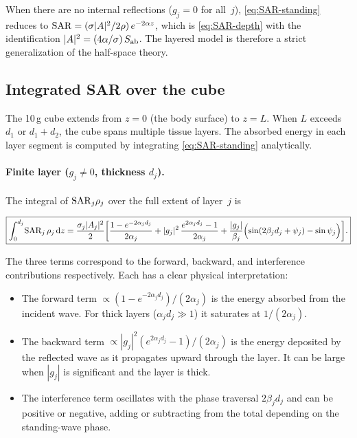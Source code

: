 \begin{remark}
When there are no internal reflections ($g_j = 0$ for all~$j$),
\cref{eq:SAR-standing} reduces to $\mathrm{SAR} = (\sigma|A|^2/2\rho)\,
e^{-2\alpha z}$, which is \cref{eq:SAR-depth} with the identification
$|A|^2 = (4\alpha/\sigma)\,S_{\mathrm{ab}}$.  The layered model is therefore a
strict generalization of the half-space theory.
\end{remark}


\subsection{Integrated SAR over the cube}
\label{sec:layered-integral}

The 10\,g cube extends from $z = 0$ (the body surface) to $z = L$.  When
$L$ exceeds $d_1$ or $d_1 + d_2$, the cube spans multiple tissue layers.
The absorbed energy in each layer segment is computed by integrating
\cref{eq:SAR-standing} analytically.

\paragraph{Finite layer ($g_j \neq 0$, thickness $d_j$).}
The integral of $\mathrm{SAR}_j \rho_j$ over the full extent of layer~$j$ is

\begin{equation}\label{eq:layer-integral}
  \boxed{%
  \int_0^{d_j}\!\SAR_j\,\rho_j\,\mathrm{d}z
  = \frac{\sigma_j |A_j|^2}{2}
    \biggl[
      \frac{1 - e^{-2\alpha_j d_j}}{2\alpha_j}
    + |g_j|^2\,\frac{e^{2\alpha_j d_j} - 1}{2\alpha_j}
    + \frac{|g_j|}{\beta_j}\Bigl(
        \sin(2\beta_j d_j + \psi_j) - \sin\psi_j
      \Bigr)
    \biggr].
  }
\end{equation}

\noindent
The three terms correspond to the forward, backward, and interference
contributions respectively.  Each has a clear physical interpretation:

\begin{itemize}[nosep]
\item The forward term $\propto (1 - e^{-2\alpha_j d_j})/(2\alpha_j)$ is
  the energy absorbed from the incident wave.  For thick layers
  ($\alpha_j d_j \gg 1$) it saturates at $1/(2\alpha_j)$.
\item The backward term $\propto |g_j|^2(e^{2\alpha_j d_j} - 1)/(2\alpha_j)$
  is the energy deposited by the reflected wave as it propagates upward
  through the layer.  It can be large when $|g_j|$ is significant and the
  layer is thick.
\item The interference term oscillates with the phase traversal
  $2\beta_j d_j$ and can be positive or negative, adding or subtracting
  from the total depending on the standing-wave phase.
\end{itemize}

